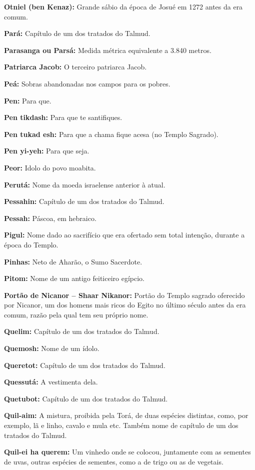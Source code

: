 \begin{hangparas}{.25in}{1}
{\textbf{Otniel (ben Kenaz):} Grande sábio da época de Josué em 1272 antes da era comum.

\textbf{Pará:} Capítulo de um dos tratados do Talmud.

\textbf{Parasanga ou Parsá:} Medida métrica equivalente a 3.840 metros.

\textbf{Patriarca Jacob:} O terceiro patriarca Jacob.

\textbf{Peá:} Sobras abandonadas nos campos para os pobres.

\textbf{Pen:} Para que.

\textbf{Pen tikdash:} Para que te santifiques.

\textbf{Pen tukad esh:} Para que a chama fique acesa (no Templo Sagrado).

\textbf{Pen yi-yeh:} Para que seja.

\textbf{Peor:} Idolo do povo moabita.

\textbf{Perutá:} Nome da moeda israelense anterior à atual.

\textbf{Pessahin:} Capítulo de um dos tratados do Talmud.

\textbf{Pessah:} Páscoa, em hebraico.

\textbf{Pigul:} Nome dado ao sacrifício que era ofertado sem total
intenção, durante a época do Templo.

\textbf{Pinhas:} Neto de Aharão, o Sumo Sacerdote.

\textbf{Pitom:} Nome de um antigo feiticeiro egípcio.

\textbf{Portão de Nicanor -- Shaar Nikanor:} Portão do Templo sagrado
oferecido por Nicanor, um dos homens mais ricos do Egito no último
século antes da era comum, razão pela qual tem seu próprio nome.

\textbf{Quelim:} Capítulo de um dos tratados do Talmud.

\textbf{Quemosh:} Nome de um ídolo.

\textbf{Queretot:} Capítulo de um dos tratados do Talmud.

\textbf{Quessutá:} A vestimenta dela.

\textbf{Quetubot:} Capítulo de um dos tratados do Talmud.

\textbf{Quil-aim:} A mistura, proibida pela Torá, de duas espécies
distintas, como, por exemplo, lã e linho, cavalo e mula etc. Também
nome de capítulo de um dos tratados do Talmud.

\textbf{Quil-ei ha querem:} Um vinhedo onde se colocou, juntamente com as sementes de uvas, outras espécies de sementes, como a de trigo ou as de vegetais.

}
\end{hangparas}
